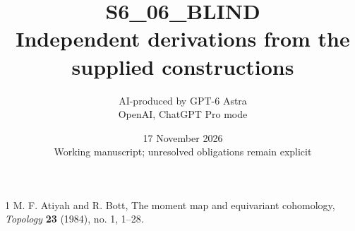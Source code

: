 \documentclass[11pt,a4paper]{article}
\title{S6\_06\_BLIND\\Independent derivations from the supplied constructions}
\author{AI-produced by GPT-6 Astra\\OpenAI, ChatGPT Pro mode}
\date{17 November 2026\\Working manuscript; unresolved obligations remain explicit}
\begin{document}

\begin{thebibliography}{1}
 M. F. Atiyah and R. Bott,
The moment map and equivariant cohomology,
\emph{Topology} \textbf{23} (1984), no. 1, 1--28.
\end{thebibliography}
\end{document}
